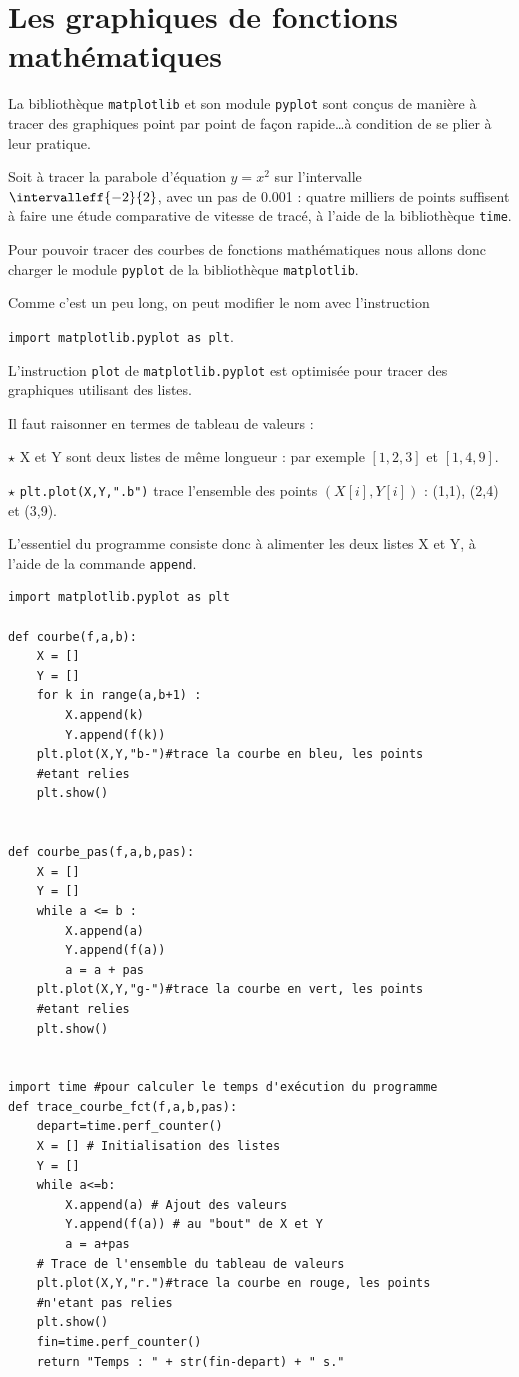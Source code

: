 \section{Les graphiques de fonctions mathématiques}

La bibliothèque \verb!matplotlib! et son module \verb!pyplot! sont conçus de manière à tracer des graphiques point
par point de façon rapide\dots à condition de se plier à leur pratique.

Soit à tracer la parabole d'équation $y=x^2$ sur l'intervalle $\intervalleff{-2}{2}$, avec un pas de 0.001 : quatre milliers de
points suffisent à faire une étude comparative de vitesse de tracé, à l'aide de la bibliothèque \verb!time!.

Pour pouvoir tracer des courbes de fonctions mathématiques nous allons donc charger le module \verb!pyplot! de la bibliothèque \verb!matplotlib!.

Comme c'est un peu long, on peut modifier le nom avec l'instruction 

\verb!import matplotlib.pyplot as plt!.


L'instruction \verb!plot! de \verb!matplotlib.pyplot! est optimisée pour tracer des graphiques utilisant des listes. 

Il faut raisonner en termes de \og tableau de valeurs \fg{} :

$\star$ X et Y sont deux listes de même longueur : par exemple $[1,2,3]$ et $[1,4,9]$.

$\star$ \verb!plt.plot(X,Y,".b")! trace l'ensemble des points $(X[i] ,Y[i])$ : (1,1), (2,4) et (3,9).

L'essentiel du programme consiste donc à alimenter les deux listes X et Y, à l'aide de la commande \verb!append!.

\begin{lstlisting}
import matplotlib.pyplot as plt

def courbe(f,a,b):
    X = []
    Y = []
    for k in range(a,b+1) :
        X.append(k)
        Y.append(f(k))
    plt.plot(X,Y,"b-")#trace la courbe en bleu, les points 
    #etant relies
    plt.show()


def courbe_pas(f,a,b,pas):
    X = []
    Y = []
    while a <= b :
        X.append(a)
        Y.append(f(a))
        a = a + pas
    plt.plot(X,Y,"g-")#trace la courbe en vert, les points 
    #etant relies
    plt.show()


import time #pour calculer le temps d'exécution du programme
def trace_courbe_fct(f,a,b,pas):
    depart=time.perf_counter()
    X = [] # Initialisation des listes
    Y = []
    while a<=b:
        X.append(a) # Ajout des valeurs
        Y.append(f(a)) # au "bout" de X et Y
        a = a+pas
    # Trace de l'ensemble du tableau de valeurs
    plt.plot(X,Y,"r.")#trace la courbe en rouge, les points 
    #n'etant pas relies
    plt.show()
    fin=time.perf_counter()
    return "Temps : " + str(fin-depart) + " s."
\end{lstlisting}

